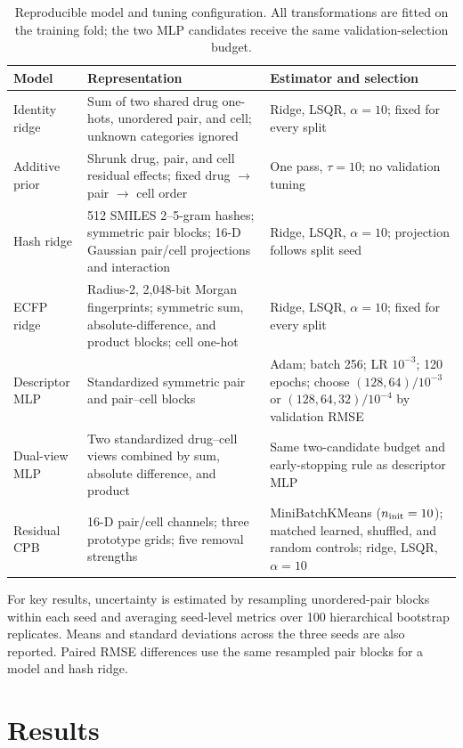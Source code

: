 \documentclass[conference]{IEEEtran}
\begin{document}
\begin{table}[!t]
\centering
\caption{Reproducible model and tuning configuration. All transformations are fitted on the training fold; the two MLP candidates receive the same validation-selection budget.}
\label{tab:config}
\begin{tabular}{p{}p{}p{}}
\toprule
Model & Representation & Estimator and selection \\
\midrule
Identity ridge & Sum of two shared drug one-hots, unordered pair, and cell; unknown categories ignored & Ridge, LSQR, $\alpha=10$; fixed for every split \\
Additive prior & Shrunk drug, pair, and cell residual effects; fixed drug $\rightarrow$ pair $\rightarrow$ cell order & One pass, $\tau=10$; no validation tuning \\
Hash ridge & 512 SMILES 2--5-gram hashes; symmetric pair blocks; 16-D Gaussian pair/cell projections and interaction & Ridge, LSQR, $\alpha=10$; projection follows split seed \\
ECFP ridge & Radius-2, 2,048-bit Morgan fingerprints; symmetric sum, absolute-difference, and product blocks; cell one-hot & Ridge, LSQR, $\alpha=10$; fixed for every split \\
Descriptor MLP & Standardized symmetric pair and pair--cell blocks & Adam; batch 256; LR $10^{-3}$; 120 epochs; choose $(128,64)/10^{-3}$ or $(128,64,32)/10^{-4}$ by validation RMSE \\
Dual-view MLP & Two standardized drug--cell views combined by sum, absolute difference, and product & Same two-candidate budget and early-stopping rule as descriptor MLP \\
Residual CPB & 16-D pair/cell channels; three prototype grids; five removal strengths & MiniBatchKMeans ($n_{\rm init}=10$); matched learned, shuffled, and random controls; ridge, LSQR, $\alpha=10$ \\
\bottomrule
\end{tabular}
\end{table}

For key results, uncertainty is estimated by resampling unordered-pair blocks within each seed and averaging seed-level metrics over 100 hierarchical bootstrap replicates. Means and standard deviations across the three seeds are also reported. Paired RMSE differences use the same resampled pair blocks for a model and hash ridge.

\section{Results}
\end{document}
